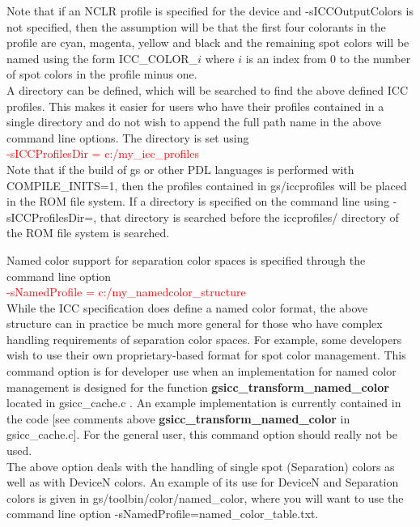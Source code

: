 \documentclass[12pt,notitlepage]{article}
\begin{document}
 Note that if an NCLR profile is specified for the device and -sICCOutputColors is not specified, then the assumption will be that the first four colorants in the profile are cyan, magenta, yellow and black and the remaining spot colors will be named using the form ICC\_COLOR\_$i$ where $i$ is an index from 0 to the number of spot colors in the profile minus one.\\

A directory can be defined, which will be searched to find the above defined ICC profiles.  This makes it easier for users who have their profiles contained in a single directory and do not wish to append the full path name in the above command line options.  The directory is set using\\

\textcolor{red}{-sICCProfilesDir = c:/my\_icc\_profiles}\\

 \noindent Note that if the build of gs or other PDL languages is performed with COMPILE\_INITS=1, then the profiles contained in gs/iccprofiles will be placed in the ROM file system. If a directory is specified on the command line using -sICCProfilesDir=, that directory is searched before the iccprofiles/ directory of the ROM file system is searched.

Named color support for separation color spaces is specified through the command line option\\

\textcolor{red}{-sNamedProfile = c:/my\_namedcolor\_structure}\\

 \noindent While the ICC specification does define a named color format, the above structure can in practice be much more general for those who have complex handling requirements of separation color spaces. For example, some developers wish to use their own proprietary-based format for spot color management. This command option is for developer use when an implementation for named color management is designed for the function {\bf gsicc\_transform\_named\_color} located in gsicc\_cache.c . An example implementation is currently contained in the code [see comments above {\bf gsicc\_transform\_named\_color} in gsicc\_cache.c]. For the general user, this command option should really not be used.\\

The above option deals with the handling of single spot (Separation) colors as well as with DeviceN colors.  An example of its use for DeviceN and Separation colors is given in gs/toolbin/color/named\_color, where you will want to use the command line option -sNamedProfile=named\_color\_table.txt.\\
\end{document}
